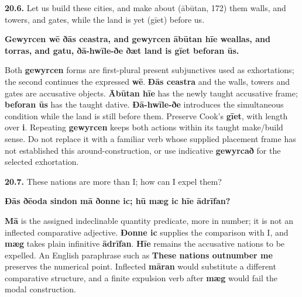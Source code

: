 \par\begin{minipage}{\linewidth}\raggedright
\textbf{20.6.} Let us build these cities, and make about (ābūtan, 172) them walls, and towers, and gates, while the land is yet (gīet) before us.

\textbf{Gewyrcen wē ðās ceastra, and gewyrcen ābūtan hīe weallas, and torras, and gatu, ðā-hwīle-ðe ðæt land is gīet beforan ūs.}

Both \textbf{gewyrcen} forms are first-plural present subjunctives used as exhortations; the second continues the expressed \textbf{wē}. \textbf{Ðās ceastra} and the walls, towers and gates are accusative objects. \textbf{Ābūtan hīe} has the newly taught accusative frame; \textbf{beforan ūs} has the taught dative. \textbf{Ðā-hwīle-ðe} introduces the simultaneous condition while the land is still before them. Preserve Cook's \textbf{gīet}, with length over \textbf{i}. Repeating \textbf{gewyrcen} keeps both actions within its taught make/\allowbreak{}build sense. Do not replace it with a familiar verb whose supplied placement frame has not established this around-construction, or use indicative \textbf{gewyrcað} for the selected exhortation.

\end{minipage}\par\addvspace{4pt}

\par\begin{minipage}{\linewidth}\raggedright
\textbf{20.7.} These nations are more than I; how can I expel them?

\textbf{Ðās ðēoda sindon mā ðonne ic; hū mæg ic hīe ādrīfan?}

\textbf{Mā} is the assigned indeclinable quantity predicate, more in number; it is not an inflected comparative adjective. \textbf{Ðonne ic} supplies the comparison with I, and \textbf{mæg} takes plain infinitive \textbf{ādrīfan}. \textbf{Hīe} remains the accusative nations to be expelled. An English paraphrase such as \textbf{These nations outnumber me} preserves the numerical point. Inflected \textbf{māran} would substitute a different comparative structure, and a finite expulsion verb after \textbf{mæg} would fail the modal construction.

\end{minipage}\par\addvspace{4pt}

